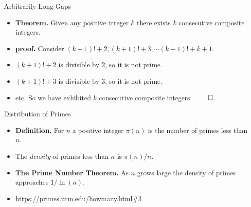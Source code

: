 \documentclass{beamer}
\begin{document}
\begin{frame}{Arbitrarily Long Gaps}

\begin{itemize}
  \item \textbf{Theorem.} Given any positive integer $k$ there exists $k$
  consecutive composite integers.
  \item \textbf{proof.} Consider $(k+1)! + 2, (k+1)! + 3, \cdots (k+1)! + k + 1$.
  \item $(k+1)! + 2$ is divisible by 2, so it is not prime.
  \item $(k+1)! + 3$ is divisible by 3, so it is not prime.
  \item etc. So we have exhibited $k$ consecutive composite integers. $\qed$.
\end{itemize}

\end{frame}


\begin{frame}{Distribution of Primes}

\begin{itemize}
  \item \textbf{Definition.} For $n$ a positive integer $\pi(n)$ is the number
  of primes less than $n$.
  \item The \emph{density} of primes less than $n$ is $\pi(n)/n$.
  \item \textbf{The Prime Number Theorem.} As $n$ grows large the density of
  primes approaches $1/\ln(n)$.
  \item https://primes.utm.edu/howmany.html\#3
\end{itemize}

\end{frame}
\end{document}
